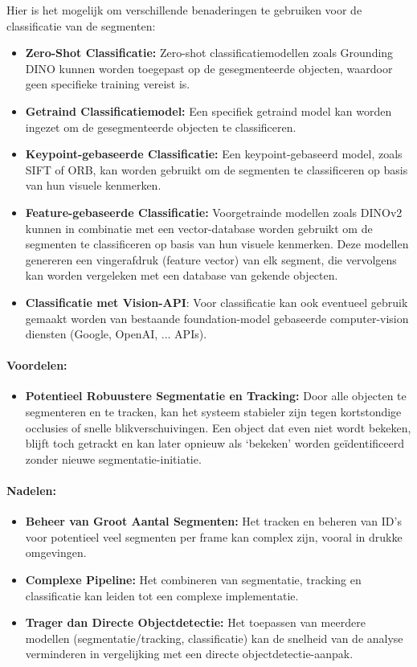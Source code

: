 Hier is het mogelijk om verschillende benaderingen te gebruiken voor de classificatie van de segmenten:
\begin{itemize}
    \item \textbf{Zero-Shot Classificatie:} Zero-shot classificatiemodellen zoals Grounding DINO kunnen worden toegepast op de gesegmenteerde objecten, waardoor geen specifieke training vereist is.
    \item \textbf{Getraind Classificatiemodel:} Een specifiek getraind model kan worden ingezet om de gesegmenteerde objecten te classificeren.
    \item \textbf{Keypoint-gebaseerde Classificatie:} Een keypoint-gebaseerd model, zoals SIFT of ORB, kan worden gebruikt om de segmenten te classificeren op basis van hun visuele kenmerken.
    \item \textbf{Feature-gebaseerde Classificatie:} Voorgetrainde modellen zoals DINOv2 kunnen in combinatie met een vector-database worden gebruikt om de segmenten te classificeren op basis van hun visuele kenmerken.
    Deze modellen genereren een vingerafdruk (feature vector) van elk segment, die vervolgens kan worden vergeleken met een database van gekende objecten.
    \item \textbf{Classificatie met Vision-API}: Voor classificatie kan ook eventueel gebruik gemaakt worden van bestaande foundation-model gebaseerde computer-vision diensten (Google, OpenAI, ... APIs).
\end{itemize}

\paragraph{Voordelen:}
\begin{itemize}
    \item \textbf{Potentieel Robuustere Segmentatie en Tracking:} Door alle objecten te segmenteren en te tracken, kan het systeem stabieler zijn tegen kortstondige 
    occlusies of snelle blikverschuivingen. Een object dat even niet wordt bekeken, blijft toch getrackt en kan later opnieuw als `bekeken' worden geïdentificeerd zonder nieuwe segmentatie-initiatie.
\end{itemize}

\paragraph{Nadelen:}
\begin{itemize}
    \item \textbf{Beheer van Groot Aantal Segmenten:} Het tracken en beheren van ID's voor potentieel veel segmenten per frame kan complex zijn, vooral in drukke omgevingen.
    \item \textbf{Complexe Pipeline:} Het combineren van segmentatie, tracking en classificatie kan leiden tot een complexe implementatie.
    \item \textbf{Trager dan Directe Objectdetectie:} Het toepassen van meerdere modellen (segmentatie/tracking, classificatie) kan de snelheid van de analyse verminderen in vergelijking met een directe objectdetectie-aanpak.
\end{itemize}

